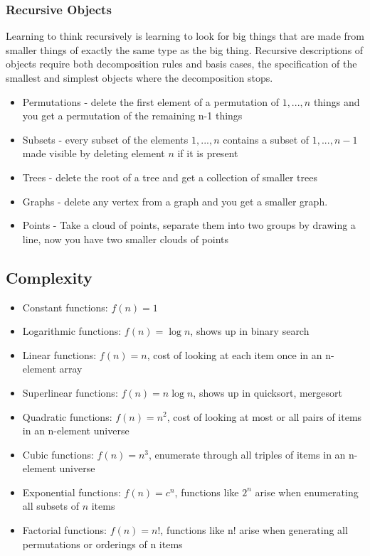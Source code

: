 \documentclass[10pt]{article}
\theoremstyle{definition}
\begin{document}
\subsubsection{Recursive Objects}
Learning to think recursively is learning to look for big things that are made from smaller things of exactly the same type as the big thing. Recursive descriptions of objects require both decomposition rules and basis cases, the specification of the smallest and simplest objects where the decomposition stops.
\begin{itemize}
    \item Permutations - delete the first element of a permutation of ${1,...,n}$ things and you get a permutation of the remaining n-1 things
    \item Subsets - every subset of the elements ${1,...,n}$ contains a subset of ${1,...,n-1}$ made visible by deleting element $n$ if it is present
    \item Trees - delete the root of a tree and get a collection of smaller trees
    \item Graphs - delete any vertex from a graph and you get a smaller graph.
    \item Points - Take a cloud of points, separate them into two groups by drawing a line, now you have two smaller clouds of points
\end{itemize}

\subsection{Complexity}
\begin{itemize}
    \item Constant functions: $f(n)=1$
    \item Logarithmic functions: $f(n) = \log n$, shows up in binary search
    \item Linear functions: $f(n) = n$, cost of looking at each item once in an n-element array
    \item Superlinear functions: $f(n)=n\log n$, shows up in quicksort, mergesort
    \item Quadratic functions: $f(n)=n^2$, cost of looking at most or all pairs of items in an n-element universe
    \item Cubic functions: $f(n)=n^3$, enumerate through all triples of items in an n-element universe
    \item Exponential functions: $f(n)=c^n$, functions like $2^n$ arise when enumerating all subsets of $n$ items
    \item Factorial functions: $f(n)=n!$, functions like n! arise when generating all permutations or orderings of n items
\end{itemize}
\end{document}
